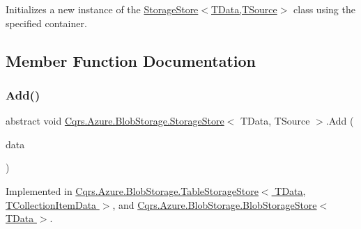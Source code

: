 Initializes a new instance of the \hyperlink{classCqrs_1_1Azure_1_1BlobStorage_1_1StorageStore_ae7a725cdcb7de73e097b02c19463bae7}{Storage\+Store$<$\+T\+Data,\+T\+Source$>$} class using the specified container. 



\subsection{Member Function Documentation}
\mbox{\label{classCqrs_1_1Azure_1_1BlobStorage_1_1StorageStore_af56bdbd7fa6650aaef5c0bab9ed55f1a}} 
\subsubsection{\texorpdfstring{Add()}{Add()}\hspace{0.1cm}{\footnotesize\ttfamily [1/2]}}
{\footnotesize\ttfamily abstract void \hyperlink{classCqrs_1_1Azure_1_1BlobStorage_1_1StorageStore}{Cqrs.\+Azure.\+Blob\+Storage.\+Storage\+Store}$<$ T\+Data, T\+Source $>$.Add (\begin{DoxyParamCaption}\item[{T\+Data}]{data }\end{DoxyParamCaption})\hspace{0.3cm}{\ttfamily [pure virtual]}}



Implemented in \hyperlink{classCqrs_1_1Azure_1_1BlobStorage_1_1TableStorageStore_ad9becfb4b149c645450deba342696e54}{Cqrs.\+Azure.\+Blob\+Storage.\+Table\+Storage\+Store$<$ T\+Data, T\+Collection\+Item\+Data $>$}, and \hyperlink{classCqrs_1_1Azure_1_1BlobStorage_1_1BlobStorageStore_a527ef0e0d39f9e01f4112b6bc90129b2}{Cqrs.\+Azure.\+Blob\+Storage.\+Blob\+Storage\+Store$<$ T\+Data $>$}.

\mbox{\label{classCqrs_1_1Azure_1_1BlobStorage_1_1StorageStore_a989d749e5f9efc10b1a416feec02657d}} 
